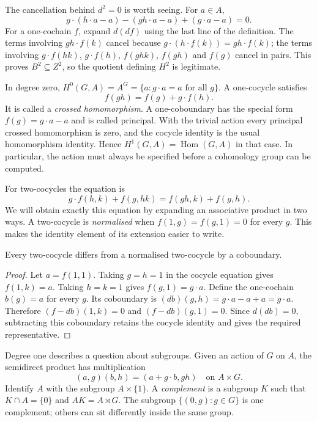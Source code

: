 The cancellation behind $d^2=0$ is worth seeing. For $a\in A$,
\[
g\cdot(h\cdot a-a)-(gh\cdot a-a)+(g\cdot a-a)=0.
\]
For a one-cochain $f$, expand $d(df)$ using the last line of the definition. The terms involving $gh\cdot f(k)$ cancel because $g\cdot(h\cdot f(k))=gh\cdot f(k)$; the terms involving $g\cdot f(hk)$, $g\cdot f(h)$, $f(ghk)$, $f(gh)$ and $f(g)$ cancel in pairs. This proves $B^2\subseteq Z^2$, so the quotient defining $H^2$ is legitimate.

In degree zero, $H^0(G,A)=A^G=\{a:g\cdot a=a\text{ for all }g\}$.
A one-cocycle satisfies
\[
f(gh)=f(g)+g\cdot f(h).
\]
It is called a \emph{crossed homomorphism}. A one-coboundary has the special form $f(g)=g\cdot a-a$ and is called principal. With the trivial action every principal crossed homomorphism is zero, and the cocycle identity is the usual homomorphism identity. Hence $H^1(G,A)=\operatorname{Hom}(G,A)$ in that case. In particular, the action must always be specified before a cohomology group can be computed.

For two-cocycles the equation is
\[
g\cdot f(h,k)+f(g,hk)=f(gh,k)+f(g,h).
\]
We will obtain exactly this equation by expanding an associative product in two ways. A two-cocycle is \emph{normalised} when $f(1,g)=f(g,1)=0$ for every $g$. This makes the identity element of its extension easier to write.

\begin{lemma}\label{lem:normalised}
Every two-cocycle differs from a normalised two-cocycle by a coboundary.
\end{lemma}

\begin{proof}
Let $a=f(1,1)$. Taking $g=h=1$ in the cocycle equation gives $f(1,k)=a$. Taking $h=k=1$ gives $f(g,1)=g\cdot a$. Define the one-cochain $b(g)=a$ for every $g$. Its coboundary is
$(db)(g,h)=g\cdot a-a+a=g\cdot a$. Therefore
$(f-db)(1,k)=0$ and $(f-db)(g,1)=0$. Since $d(db)=0$, subtracting this coboundary retains the cocycle identity and gives the required representative.
\end{proof}

Degree one describes a question about subgroups. Given an action of $G$ on $A$, the semidirect product has multiplication
\[
(a,g)(b,h)=(a+g\cdot b,gh)
\quad\text{on }A\times G.
\]
Identify $A$ with the subgroup $A\times\{1\}$. A \emph{complement} is a subgroup $K$ such that $K\cap A=\{0\}$ and $AK=A\rtimes G$. The subgroup $\{(0,g):g\in G\}$ is one complement; others can sit differently inside the same group.

